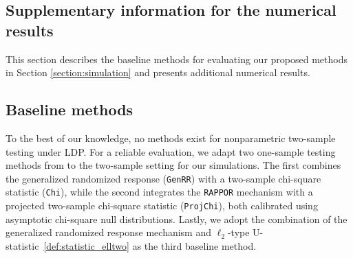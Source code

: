 \documentclass[twoside,11pt]{article}
\begin{document}
\begin{appendix}
	\section{Supplementary information for the numerical results}\label{appendix:simulation}
	This section describes the baseline methods for evaluating our proposed methods in Section \ref{section:simulation} and presents additional numerical results.
	\subsection{Baseline methods}\label{appendix:baseline}
	To the best of our knowledge, no methods exist for nonparametric two-sample testing under LDP. For a reliable evaluation, we adapt two one-sample testing methods from \citet{Gaboardi2018LDPChisq} to the two-sample setting for our simulations. The first combines the generalized randomized response (\texttt{GenRR}) with a two-sample chi-square statistic (\texttt{Chi}), while the second integrates the \texttt{RAPPOR} mechanism with a projected two-sample chi-square statistic (\texttt{ProjChi}), both calibrated using asymptotic chi-square null distributions. Lastly, we adopt the combination of the generalized randomized response mechanism and $\ell_2$-type U-statistic~\eqref{def:statistic_elltwo} as the third baseline method.
	

\end{appendix}
\end{document}
